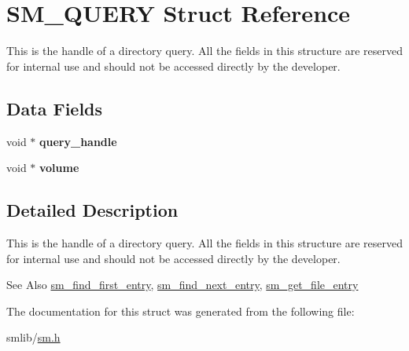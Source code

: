 \hypertarget{struct_s_m___q_u_e_r_y}{\section{S\-M\-\_\-\-Q\-U\-E\-R\-Y Struct Reference}
\label{struct_s_m___q_u_e_r_y}
}


This is the handle of a directory query. All the fields in this structure are reserved for internal use and should not be accessed directly by the developer.  


\subsection*{Data Fields}
\begin{DoxyCompactItemize}
\item 
\hypertarget{struct_s_m___q_u_e_r_y_a4a97224d0900c21cbefa83cc2682a5da}{void $\ast$ {\bfseries query\-\_\-handle}}\label{struct_s_m___q_u_e_r_y_a4a97224d0900c21cbefa83cc2682a5da}

\item 
\hypertarget{struct_s_m___q_u_e_r_y_a7619a521b64dddc7732b29e251f38684}{void $\ast$ {\bfseries volume}}\label{struct_s_m___q_u_e_r_y_a7619a521b64dddc7732b29e251f38684}

\end{DoxyCompactItemize}


\subsection{Detailed Description}
This is the handle of a directory query. All the fields in this structure are reserved for internal use and should not be accessed directly by the developer. 

\begin{DoxySeeAlso}{See Also}
\hyperlink{sm_8h_a05c051930d83c1c79324bc1b1ef3aff4}{sm\-\_\-find\-\_\-first\-\_\-entry}, \hyperlink{sm_8h_a9dcd85a62788fcb043f5a7440d0157ad}{sm\-\_\-find\-\_\-next\-\_\-entry}, \hyperlink{sm_8h_ae42546f1d89f496dc21f12b9291a4019}{sm\-\_\-get\-\_\-file\-\_\-entry}


\end{DoxySeeAlso}


The documentation for this struct was generated from the following file\-:\begin{DoxyCompactItemize}
\item 
smlib/\hyperlink{sm_8h}{sm.\-h}\end{DoxyCompactItemize}
